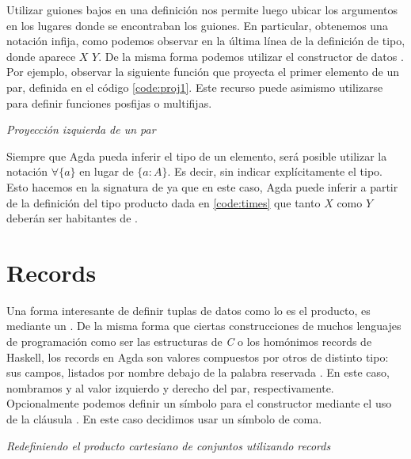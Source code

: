 Utilizar guiones bajos en una definición nos permite luego ubicar los argumentos en los lugares donde se encontraban los guiones. En particular, obtenemos una notación infija, como podemos observar en la última línea de la definición de tipo, donde aparece $X$ \AgdaDatatype{$\times$} $Y$. De la misma forma podemos utilizar el constructor de datos \AgdaInductiveConstructor{$\_,\_$}. Por ejemplo, observar la siguiente función que proyecta el primer elemento de un par, definida en el código \ref{code:proj1}. Este recurso puede asimismo utilizarse para definir funciones posfijas o multifijas.

\begin{agdacode}{\it Proyección izquierda de un par}\label{code:proj1}

\end{agdacode}

Siempre que Agda pueda inferir el tipo de un elemento, será posible utilizar la notación $\forall\{a\}$ en lugar de $\{a : A\}$. Es decir, sin indicar explícitamente el tipo. Esto hacemos en la signatura de  ya que en este caso, Agda puede inferir a partir de la definición del tipo producto dada en \ref{code:times} que tanto $X$ como $Y$ deberán ser habitantes de .

\section{Records}\label{agda:record}

Una forma interesante de definir tuplas de datos como lo es el producto, es mediante un . De la misma forma que ciertas construcciones de muchos lenguajes de programación como ser las estructuras de {\it C} o los homónimos records de Haskell, los records en Agda son valores compuestos por otros de distinto tipo: sus campos, listados por nombre debajo de la palabra reservada . En este caso, nombramos  y  al valor izquierdo y derecho del par, respectivamente. Opcionalmente podemos definir un símbolo para el constructor mediante el uso de la cláusula . En este caso decidimos usar un símbolo de coma.

\begin{agdacode}{\it Redefiniendo el producto cartesiano de conjuntos utilizando records} \label{code:record:producto}

\end{agdacode}

